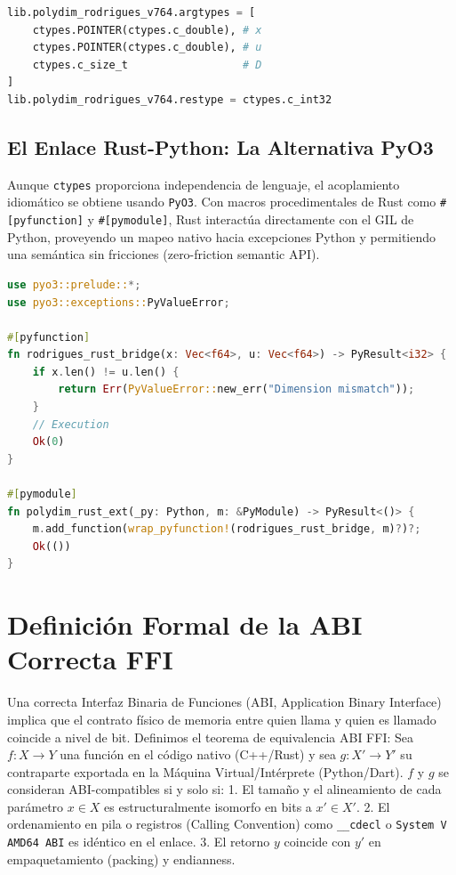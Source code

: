 \begin{lstlisting}[language=Python]
lib.polydim_rodrigues_v764.argtypes = [
    ctypes.POINTER(ctypes.c_double), # x
    ctypes.POINTER(ctypes.c_double), # u
    ctypes.c_size_t                  # D
]
lib.polydim_rodrigues_v764.restype = ctypes.c_int32
\end{lstlisting}

\subsection{El Enlace Rust-Python: La Alternativa PyO3}
Aunque \texttt{ctypes} proporciona independencia de lenguaje, el acoplamiento idiomático se obtiene usando \texttt{PyO3}. Con macros procedimentales de Rust como \texttt{\#[pyfunction]} y \texttt{\#[pymodule]}, Rust interactúa directamente con el GIL de Python, proveyendo un mapeo nativo hacia excepciones Python y permitiendo una semántica sin fricciones (zero-friction semantic API).

\begin{lstlisting}[language=Rust]
use pyo3::prelude::*;
use pyo3::exceptions::PyValueError;

#[pyfunction]
fn rodrigues_rust_bridge(x: Vec<f64>, u: Vec<f64>) -> PyResult<i32> {
    if x.len() != u.len() {
        return Err(PyValueError::new_err("Dimension mismatch"));
    }
    // Execution
    Ok(0)
}

#[pymodule]
fn polydim_rust_ext(_py: Python, m: &PyModule) -> PyResult<()> {
    m.add_function(wrap_pyfunction!(rodrigues_rust_bridge, m)?)?;
    Ok(())
}
\end{lstlisting}

\section{Definición Formal de la ABI Correcta FFI}

Una correcta Interfaz Binaria de Funciones (ABI, Application Binary Interface) implica que el contrato físico de memoria entre quien llama y quien es llamado coincide a nivel de bit.
Definimos el teorema de equivalencia ABI FFI:
Sea $f: X \to Y$ una función en el código nativo (C++/Rust) y sea $g: X' \to Y'$ su contraparte exportada en la Máquina Virtual/Intérprete (Python/Dart). $f$ y $g$ se consideran ABI-compatibles si y solo si:
1. El tamaño y el alineamiento de cada parámetro $x \in X$ es estructuralmente isomorfo en bits a $x' \in X'$.
2. El ordenamiento en pila o registros (Calling Convention) como \texttt{\_\_cdecl} o \texttt{System V AMD64 ABI} es idéntico en el enlace.
3. El retorno $y$ coincide con $y'$ en empaquetamiento (packing) y endianness.

